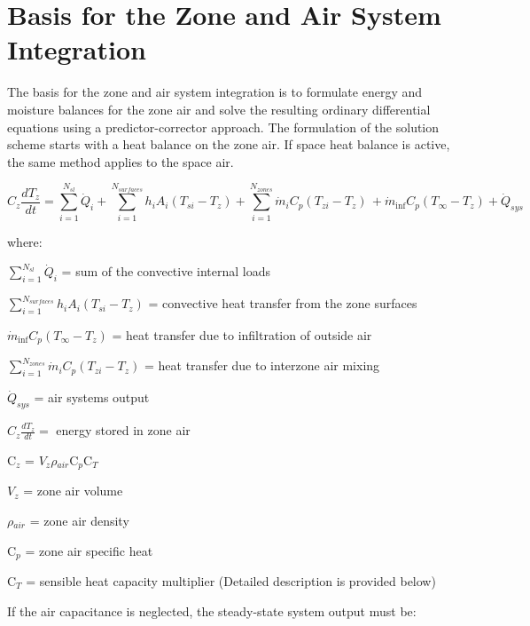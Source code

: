 \section{Basis for the Zone and Air System Integration}\label{basis-for-the-zone-and-air-system-integration}

The basis for the zone and air system integration is to formulate energy and moisture balances for the zone air and solve the resulting ordinary differential equations using a predictor-corrector approach. The formulation of the solution scheme starts with a heat balance on the zone air. If space heat balance is active, the same method applies to the space air.

\begin{equation}
{C_z}\frac{{d{T_z}}}{{dt}} = \sum\limits_{i = 1}^{{N_{sl}}} {{{\dot Q}_i}}  + \sum\limits_{i = 1}^{{N_{surfaces}}} {{h_i}} {A_i}\left( {{T_{si}} - {T_z}} \right) + \sum\limits_{i = 1}^{{N_{zones}}} {{{\dot m}_i}} {C_p}\left( {{T_{zi}} - {T_z}} \right)\, + {\dot m_{\inf }}{C_p}\left( {{T_\infty } - {T_z}} \right) + {\dot Q_{sys}}
\label{eq:DiffEqZoneAirHeatBal}
\end{equation}

where:

\(\sum\limits_{i = 1}^{{N_{sl}}} {{{\dot Q}_i}}\) = sum of the convective internal loads

\(\sum\limits_{i = 1}^{{N_{surfaces}}} {{h_i}} {A_i}\left( {{T_{si}} - {T_z}} \right)\) = convective heat transfer from the zone surfaces

\({\dot m_{\inf }}{C_p}\left( {{T_\infty } - {T_z}} \right)\) = heat transfer due to infiltration of outside air

\(\sum_{i = 1}^{N_{zones}} \dot m_i C_p\left( T_{zi} - {T_z} \right)\) = heat transfer due to interzone air mixing

\({\dot Q_{sys}}\) = air systems output

${C_z}\frac{dT_z}{dt} =$ energy stored in zone air

C\(_{z}\) = $V_{z}$$\rho$\(_{air}\)C\(_{p}\)C\(_{T}\)

\(V_{z}\) = zone air volume

$\rho$\(_{air}\) = zone air density

C\(_{p}\) = zone air specific heat

C\(_{T}\) = sensible heat capacity multiplier (Detailed description is provided below)

If the air capacitance is neglected, the steady-state system output must be:

